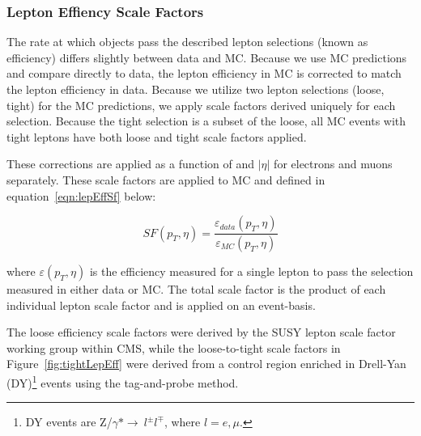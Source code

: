 
\subsubsection{Lepton Effiency Scale Factors}
The rate at which objects pass the described lepton selections (known as efficiency) differs slightly between data and MC. Because we use MC predictions and compare directly to data,
the lepton efficiency in MC is corrected to match the lepton efficiency in data. Because we utilize two lepton selections (loose, tight) for the MC predictions, we apply scale
factors derived uniquely for each selection. Because the tight selection is a subset of the loose, all MC events with tight leptons have both loose and tight scale factors applied. 

These corrections are applied as a function of \pt and $|\eta|$ for electrons and muons
separately. These scale factors are applied to MC and defined in equation~\ref{eqn:lepEffSf} below:

\begin{equation}
\label{eqn:lepEffSf}
 SF(p_{T},\eta) = \frac{\varepsilon_{data}(p_{T},\eta)}{\varepsilon_{MC}(p_{T},\eta)}
\end{equation}

\noindent where $\varepsilon(p_{T},\eta)$ is the efficiency measured for a single lepton to pass the selection measured in either data or MC. The total scale factor is the
product of each individual lepton scale factor and is applied on an event-basis.

The loose efficiency scale factors were derived by the SUSY lepton scale factor working group within CMS, while the loose-to-tight scale factors in Figure~\ref{fig:tightLepEff} were derived
from a control region enriched in Drell-Yan (DY)\footnote{DY events are Z/$\gamma*\rightarrow~l^{\pm}l^{\mp}$, where $l=e,\mu$.} events using the tag-and-probe method. 

